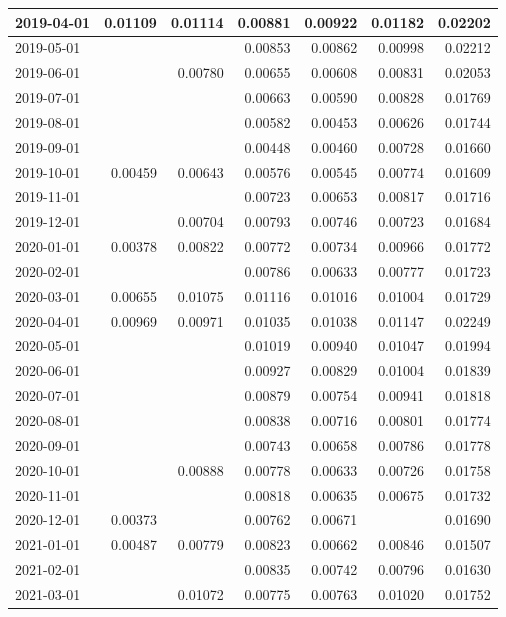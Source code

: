 \documentclass[
]{book}
\begin{document}
\begin{table}
\begin{tabular}[t]{l|r|r|r|r|r|r}
\hline
2019-04-01 & 0.01109 & 0.01114 & 0.00881 & 0.00922 & 0.01182 & 0.02202\\
\hline
2019-05-01 &  &  & 0.00853 & 0.00862 & 0.00998 & 0.02212\\
\hline
2019-06-01 &  & 0.00780 & 0.00655 & 0.00608 & 0.00831 & 0.02053\\
\hline
2019-07-01 &  &  & 0.00663 & 0.00590 & 0.00828 & 0.01769\\
\hline
2019-08-01 &  &  & 0.00582 & 0.00453 & 0.00626 & 0.01744\\
\hline
2019-09-01 &  &  & 0.00448 & 0.00460 & 0.00728 & 0.01660\\
\hline
2019-10-01 & 0.00459 & 0.00643 & 0.00576 & 0.00545 & 0.00774 & 0.01609\\
\hline
2019-11-01 &  &  & 0.00723 & 0.00653 & 0.00817 & 0.01716\\
\hline
2019-12-01 &  & 0.00704 & 0.00793 & 0.00746 & 0.00723 & 0.01684\\
\hline
2020-01-01 & 0.00378 & 0.00822 & 0.00772 & 0.00734 & 0.00966 & 0.01772\\
\hline
2020-02-01 &  &  & 0.00786 & 0.00633 & 0.00777 & 0.01723\\
\hline
2020-03-01 & 0.00655 & 0.01075 & 0.01116 & 0.01016 & 0.01004 & 0.01729\\
\hline
2020-04-01 & 0.00969 & 0.00971 & 0.01035 & 0.01038 & 0.01147 & 0.02249\\
\hline
2020-05-01 &  &  & 0.01019 & 0.00940 & 0.01047 & 0.01994\\
\hline
2020-06-01 &  &  & 0.00927 & 0.00829 & 0.01004 & 0.01839\\
\hline
2020-07-01 &  &  & 0.00879 & 0.00754 & 0.00941 & 0.01818\\
\hline
2020-08-01 &  &  & 0.00838 & 0.00716 & 0.00801 & 0.01774\\
\hline
2020-09-01 &  &  & 0.00743 & 0.00658 & 0.00786 & 0.01778\\
\hline
2020-10-01 &  & 0.00888 & 0.00778 & 0.00633 & 0.00726 & 0.01758\\
\hline
2020-11-01 &  &  & 0.00818 & 0.00635 & 0.00675 & 0.01732\\
\hline
2020-12-01 & 0.00373 &  & 0.00762 & 0.00671 &  & 0.01690\\
\hline
2021-01-01 & 0.00487 & 0.00779 & 0.00823 & 0.00662 & 0.00846 & 0.01507\\
\hline
2021-02-01 &  &  & 0.00835 & 0.00742 & 0.00796 & 0.01630\\
\hline
2021-03-01 &  & 0.01072 & 0.00775 & 0.00763 & 0.01020 & 0.01752\\
\hline
\end{tabular}
\end{table}
\end{document}
